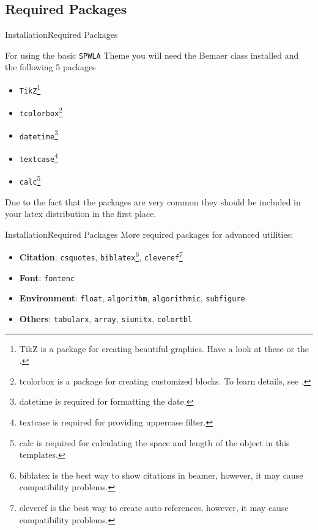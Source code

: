 \documentclass[10pt,xcolor={dvipsnames},aspectratio=169]{beamer}
\begin{document}
\subsection{Required Packages}
\begin{frame}{Installation}{Required Packages}

  For using the basic \texttt{SPWLA} Theme you will need the Bemaer class installed and the following 5 packages
  \begin{itemize}
    \item \texttt{TikZ}\footnote{TikZ is a package for creating beautiful graphics. Have a look at these  or the .}
    \item \texttt{tcolorbox}\footnote{tcolorbox is a package for creating customized blocks. To learn details, see .}
    \item \texttt{datetime}\footnote{datetime is required for formatting the date.}
    \item \texttt{textcase}\footnote{textcase is required for providing uppercase filter.}
    \item \texttt{calc}\footnote{calc is required for calculating the space and length of the object in this templates.}
  \end{itemize}
  Due to the fact that the packages are very common they should be included in your latex distribution in the first place.
\end{frame}

\begin{frame}{Installation}{Required Packages}
More required packages for advanced utilities:
\begin{itemize}
  \item \textbf{Citation}: \texttt{csquotes}, \texttt{biblatex}\footnote{biblatex is the best way to show citations in beamer, however, it may cause compatibility problems.}, \texttt{cleveref}\footnote{cleveref is the best way to create auto references, however, it may cause compatibility problems.}
  \item \textbf{Font}: \texttt{fontenc}
  \item \textbf{Environment}: \texttt{float}, \texttt{algorithm}, \texttt{algorithmic}, \texttt{subfigure}
  \item \textbf{Others}: \texttt{tabularx}, \texttt{array}, \texttt{siunitx}, \texttt{colortbl}
\end{itemize}
\end{frame}
\end{document}
